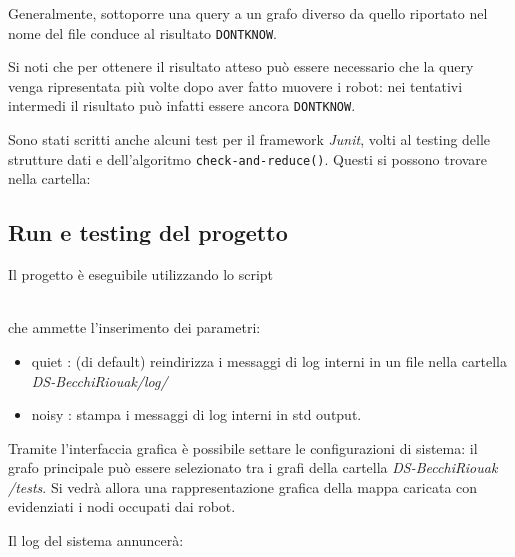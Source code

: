 Generalmente, sottoporre una query a un grafo diverso da quello riportato
nel nome del file conduce al risultato \texttt{DONTKNOW}.

Si noti che per ottenere il risultato atteso può essere necessario
che la query venga ripresentata più volte dopo aver fatto muovere i robot:
nei tentativi intermedi il risultato può infatti essere ancora \texttt{DONTKNOW}.

Sono stati scritti anche alcuni test per il framework \emph{Junit}, volti al
testing delle strutture dati e dell'algoritmo \texttt{check-and-reduce()}.
Questi si possono trovare nella cartella:\\

\subsection{Run e testing del progetto}
Il progetto è eseguibile utilizzando lo script


\\
che ammette l'inserimento dei parametri:
\begin{itemize}
\item quiet : (di default) reindirizza i messaggi di log interni in un file nella
  cartella \emph{DS-BecchiRiouak/log/ }
\item noisy : stampa i messaggi di log interni in std output.
\end{itemize}

Tramite l'interfaccia grafica è possibile settare le configurazioni di sistema:
il grafo principale può essere selezionato tra i grafi della cartella
\emph{DS-BecchiRiouak /tests}.
Si vedrà allora una rappresentazione grafica della mappa caricata con
evidenziati i nodi occupati dai robot.

Il log del sistema annuncerà:




